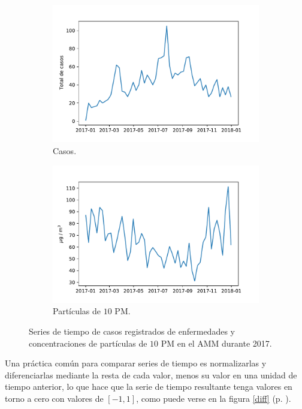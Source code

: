 \documentclass[paper=leter, fontsize=11pt]{scrartcl}
\begin{document}
\begin{figure}
  \begin{subfigure}{.5\textwidth}
      \centering
      \includegraphics[scale=0.4]{2017_ingresos_semana.pdf}
      \caption{Casos.}
  \end{subfigure}
  \begin{subfigure}{0.5\textwidth}
      \centering
      \includegraphics[scale=0.4]{2017_PM10_semana.pdf}
      \caption{Partículas de $10$ PM.}
  \end{subfigure}
  \caption{Series de tiempo de casos registrados de enfermedades y concentraciones de partículas de $10$ PM en el AMM durante 2017.}
  \label{datos}
\end{figure}

Una práctica común para comparar series de tiempo es normalizarlas y diferenciarlas mediante la resta de cada valor, menos su valor en una unidad de tiempo anterior, lo que hace que la serie de tiempo resultante tenga valores en torno a cero con valores de $[-1, 1]$, como puede verse en la figura \ref{diff} (p. \pageref{diff}).
\end{document}

